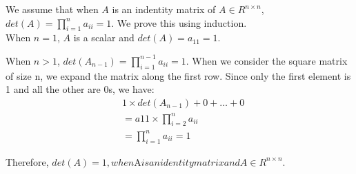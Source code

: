 \documentclass[10pt,a4paper]{article}
\begin{document}
We assume that when $A$ is an indentity matrix of $A\in R^{n\times n}$, $det(A) = \prod_{i=1}^{n}{a_{ii}} = 1$. We prove this using induction.\\

When $n=1$, $A$ is a scalar and $det(A) = a_{11} = 1$. 

When $n>1$, $det(A_{n-1}) = \prod_{i=1}^{n-1}{a_{ii}} = 1$. When we consider the square matrix of size n, we expand the matrix along the first row. Since only the first element is 1 and all the other are 0s, we have:
\begin{align*}
&1\times det(A_{n-1}) + 0 +\dots+0 \\
&= a11 \times  \prod_{i=2}^{n}{a_{ii}}\\
&=\prod_{i=1}^{n}{a_{ii}} = 1
\end{align*}

Therefore, $det(A) = 1, when $A$ is an identity matrix and A\in R^{n\times n}$.
\end{document}
